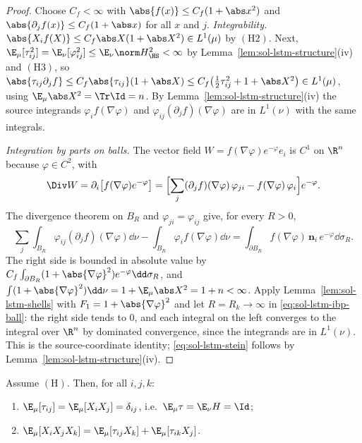 \documentclass[../main.tex]{subfiles}
\begin{document}
\begin{proof}
Choose $C_f<\infty$ with $\abs{f(x)}\le C_f(1+\abs x^2)$ and $\abs{\partial_jf(x)}\le C_f(1+\abs x)$
for all $x$ and $j$.  \emph{Integrability.}  $\abs{X_if(X)}\le C_f\abs X(1+\abs X^2)\in L^1(\mu)$
by $(\mathrm H2)$.  Next, $\E_\mu[\tau_{ij}^2]=\E_\nu[\varphi_{ij}^2]\le\E_\nu\norm H_{\HS}^2<\infty$
by Lemma~\ref{lem:sol-lstm-structure}(iv) and $(\mathrm H3)$, so
$\abs{\tau_{ij}\partial_jf}\le C_f\abs{\tau_{ij}}(1+\abs X)\le C_f\bigl(\tfrac12\tau_{ij}^2+1+\abs X^2\bigr)\in L^1(\mu)$,
using $\E_\mu\abs X^2=\Tr\Id=n$.  By Lemma~\ref{lem:sol-lstm-structure}(iv) the source
integrands $\varphi_if(\nabla\varphi)$ and $\varphi_{ij}(\partial_jf)(\nabla\varphi)$ are in
$L^1(\nu)$ with the same integrals.

\emph{Integration by parts on balls.}  The vector field $W=f(\nabla\varphi)e^{-\varphi}e_i$ is
$C^1$ on $\R^n$ because $\varphi\in C^2$, with
\[
  \Div W=\partial_i\bigl[f(\nabla\varphi)e^{-\varphi}\bigr]
  =\Bigl[\sum_j(\partial_jf)(\nabla\varphi)\,\varphi_{ji}-f(\nabla\varphi)\,\varphi_i\Bigr]e^{-\varphi}.
\]
The divergence theorem on $B_R$ and $\varphi_{ji}=\varphi_{ij}$ give, for every $R>0$,
\begin{equation}
  \sum_j\int_{B_R}\varphi_{ij}(\partial_jf)(\nabla\varphi)\dd\nu-\int_{B_R}\varphi_if(\nabla\varphi)\dd\nu
  =\int_{\partial B_R}f(\nabla\varphi)\,\mathbf n_i\,e^{-\varphi}\dd\sigma_R .
  \label{eq:sol-lstm-ibp-ball}
\end{equation}
The right side is bounded in absolute value by $C_f\int_{\partial B_R}(1+\abs{\nabla\varphi}^2)e^{-\varphi}\dd\sigma_R$,
and $\int(1+\abs{\nabla\varphi}^2)\dd\nu=1+\E_\mu\abs X^2=1+n<\infty$.  Apply
Lemma~\ref{lem:sol-lstm-shells} with $F_1=1+\abs{\nabla\varphi}^2$ and let $R=R_k\to\infty$ in
\eqref{eq:sol-lstm-ibp-ball}: the right side tends to $0$, and each integral on the left
converges to the integral over $\R^n$ by dominated convergence, since the integrands are in
$L^1(\nu)$.  This is the source-coordinate identity; \eqref{eq:sol-lstm-stein} follows by
Lemma~\ref{lem:sol-lstm-structure}(iv).
\end{proof}

\begin{corollary}[Consequences]
\label{cor:sol-lstm-stein-consequences}
Assume $(\mathrm H)$.  Then, for all $i,j,k$:
\begin{enumerate}
\item[(i)] $\E_\mu[\tau_{ij}]=\E_\mu[X_iX_j]=\delta_{ij}$, i.e.\ $\E_\mu\tau=\E_\nu H=\Id$;
\item[(ii)] $\E_\mu[X_iX_jX_k]=\E_\mu[\tau_{ij}X_k]+\E_\mu[\tau_{ik}X_j]$.
\end{enumerate}
\end{corollary}
\end{document}
